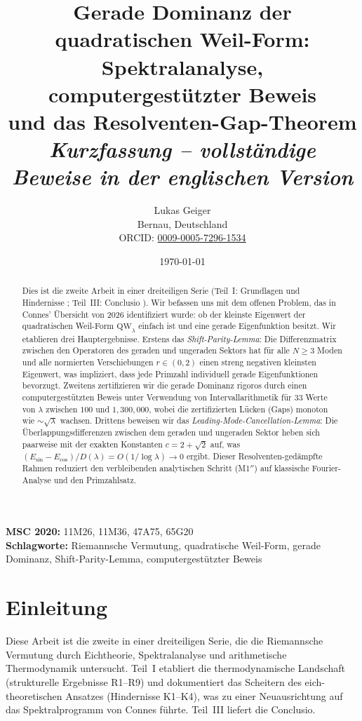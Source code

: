 \documentclass[12pt,a4paper]{article}
\title{Gerade Dominanz der quadratischen Weil-Form:\\ Spektralanalyse, computergestützter Beweis\\ und das Resolventen-Gap-Theorem\\[6pt] \large\textit{Kurzfassung -- vollständige Beweise in der englischen Version}}
\author{Lukas Geiger\\
\small Bernau, Deutschland\\
\small ORCID: \href{https://orcid.org/0009-0005-7296-1534}{0009-0005-7296-1534}}
\date{\today}
\theoremstyle{definition}
\theoremstyle{remark}
\begin{document}
\maketitle

\begin{abstract}
Dies ist die zweite Arbeit in einer dreiteiligen Serie (Teil~I: Grundlagen und Hindernisse \cite{Geiger2026partI}; Teil~III: Conclusio \cite{Geiger2026partIII}). Wir befassen uns mit dem offenen Problem, das in Connes' Übersicht von 2026 \cite{Connes2025} identifiziert wurde: ob der kleinste Eigenwert der quadratischen Weil-Form $\mathrm{QW}_\lambda$ einfach ist und eine gerade Eigenfunktion besitzt. Wir etablieren drei Hauptergebnisse. Erstens das \emph{Shift-Parity-Lemma}: Die Differenzmatrix zwischen den Operatoren des geraden und ungeraden Sektors hat für alle $N \geq 3$ Moden und alle normierten Verschiebungen $r \in (0,2)$ einen streng negativen kleinsten Eigenwert, was impliziert, dass jede Primzahl individuell gerade Eigenfunktionen bevorzugt. Zweitens zertifizieren wir die gerade Dominanz rigoros durch einen computergestützten Beweis unter Verwendung von Intervallarithmetik für $33$ Werte von $\lambda$ zwischen $100$ und $1{,}300{,}000$, wobei die zertifizierten Lücken (Gaps) monoton wie $\sim\!\sqrt{\lambda}$ wachsen. Drittens beweisen wir das \emph{Leading-Mode-Cancellation-Lemma}: Die Überlappungsdifferenzen zwischen dem geraden und ungeraden Sektor heben sich paarweise mit der exakten Konstanten $c = 2 + \sqrt{2}$ auf, was $(E_{\sin} - E_{\cos})/D(\lambda) = O(1/\log\lambda) \to 0$ ergibt. Dieser Resolventen-gedämpfte Rahmen reduziert den verbleibenden analytischen Schritt (M1$''$) auf klassische Fourier-Analyse und den Primzahlsatz.
\end{abstract}

\noindent\textbf{MSC 2020:} 11M26, 11M36, 47A75, 65G20\\
\textbf{Schlagworte:} Riemannsche Vermutung, quadratische Weil-Form, gerade Dominanz, Shift-Parity-Lemma, computergestützter Beweis

\tableofcontents

\section{Einleitung}
\label{sec:intro}

Diese Arbeit ist die zweite in einer dreiteiligen Serie, die die Riemannsche Vermutung durch Eichtheorie, Spektralanalyse und arithmetische Thermodynamik untersucht. Teil~I \cite{Geiger2026partI} etabliert die thermodynamische Landschaft (strukturelle Ergebnisse R1--R9) und dokumentiert das Scheitern des eich-theoretischen Ansatzes (Hindernisse K1--K4), was zu einer Neuausrichtung auf das Spektralprogramm von Connes führte. Teil~III \cite{Geiger2026partIII} liefert die Conclusio.
\end{document}
